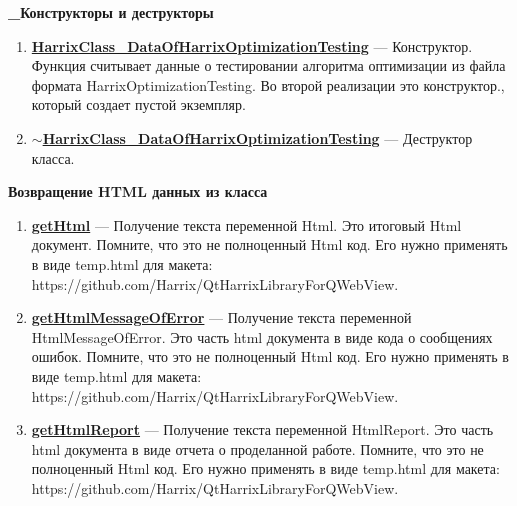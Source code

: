 \textbf{\_Конструкторы и деструкторы}
\begin{enumerate}

\item \textbf{\hyperref[HarrixClass_DataOfHarrixOptimizationTesting]{HarrixClass\_DataOfHarrixOptimizationTesting}} --- Конструктор. Функция считывает данные о тестировании алгоритма оптимизации из файла формата HarrixOptimizationTesting. Во второй реализации это конструктор., который создает пустой экземпляр.

\item \textbf{\hyperref[tildaHarrixClass_DataOfHarrixOptimizationTesting]{$\sim$HarrixClass\_DataOfHarrixOptimizationTesting}} --- Деструктор класса.

\end{enumerate}

\textbf{Возвращение HTML данных из класса}
\begin{enumerate}

\item \textbf{\hyperref[getHtml]{getHtml}} --- Получение текста переменной Html. Это итоговый Html документ. Помните, что это не полноценный Html код. Его нужно применять в виде temp.html для макета:      https://github.com/Harrix/QtHarrixLibraryForQWebView.

\item \textbf{\hyperref[getHtmlMessageOfError]{getHtmlMessageOfError}} --- Получение текста переменной HtmlMessageOfError. Это часть html документа в виде кода о сообщениях ошибок. Помните, что это не полноценный Html код. Его нужно применять в виде temp.html для макета: https://github.com/Harrix/QtHarrixLibraryForQWebView.

\item \textbf{\hyperref[getHtmlReport]{getHtmlReport}} --- Получение текста переменной HtmlReport. Это часть html документа в виде отчета о проделанной работе. Помните, что это не полноценный Html код. Его нужно применять в виде temp.html для макета: https://github.com/Harrix/QtHarrixLibraryForQWebView.

\end{enumerate}

